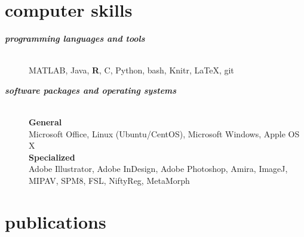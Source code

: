 \documentclass[]{friggeri-cv} %
\begin{document}
\section{computer skills}
\begin{description}
   \item[\textbf{\textit{programming languages and tools}}] \hfill \\  
	 MATLAB, Java, \textbf{R}, C, Python, bash, Knitr, \LaTeX, git
   \item[\textbf{\textit{software packages and operating systems}}] \hfill \\
	    \textbf{General} \\
		Microsoft Office, Linux (Ubuntu/CentOS), Microsoft Windows, Apple OS X \\
	    \textbf{Specialized} \\
	    Adobe Illustrator, Adobe InDesign, Adobe Photoshop, Amira, ImageJ, MIPAV, SPM8, FSL, NiftyReg, MetaMorph 
\end{description}



\section{publications}



\begin{refsection} %
\nocite{*}
\printbibliography[sorting=chronological, type=inproceedings, title={conference proceedings}, notkeyword={france}, heading=subbibliography]
\end{refsection}
\end{document}
